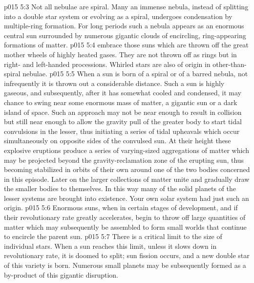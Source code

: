 \vs p015 5:3 \bibnobreakspace {} Not all nebulae are spiral. Many an immense nebula, instead of splitting into a double star system or evolving as a spiral, undergoes condensation by multiple\hyp{}ring formation. For long periods such a nebula appears as an enormous central sun surrounded by numerous gigantic clouds of encircling, ring\hyp{}appearing formations of matter.
\vs p015 5:4 \bibnobreakspace {} embrace those suns which are thrown off the great mother wheels of highly heated gases. They are not thrown off as rings but in right\hyp{} and left\hyp{}handed processions. Whirled stars are also of origin in other\hyp{}than\hyp{}spiral nebulae.
\vs p015 5:5 \bibnobreakspace {} When a sun is born of a spiral or of a barred nebula, not infrequently it is thrown out a considerable distance. Such a sun is highly gaseous, and subsequently, after it has somewhat cooled and condensed, it may chance to swing near some enormous mass of matter, a gigantic sun or a dark island of space. Such an approach may not be near enough to result in collision but still near enough to allow the gravity pull of the greater body to start tidal convulsions in the lesser, thus initiating a series of tidal upheavals which occur simultaneously on opposite sides of the convulsed sun. At their height these explosive eruptions produce a series of varying\hyp{}sized aggregations of matter which may be projected beyond the gravity\hyp{}reclamation zone of the erupting sun, thus becoming stabilized in orbits of their own around one of the two bodies concerned in this episode. Later on the larger collections of matter unite and gradually draw the smaller bodies to themselves. In this way many of the solid planets of the lesser systems are brought into existence. Your own solar system had just such an origin.
\vs p015 5:6 \bibnobreakspace {} Enormous suns, when in certain stages of development, and if their revolutionary rate greatly accelerates, begin to throw off large quantities of matter which may subsequently be assembled to form small worlds that continue to encircle the parent sun.
\vs p015 5:7 \bibnobreakspace {} There is a critical limit to the size of individual stars. When a sun reaches this limit, unless it slows down in revolutionary rate, it is doomed to split; sun fission occurs, and a new double star of this variety is born. Numerous small planets may be subsequently formed as a by\hyp{}product of this gigantic disruption.
